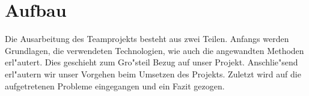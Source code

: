 \section{Aufbau}
\label {sec:aufbau}
Die Ausarbeitung des Teamprojekts besteht aus zwei Teilen.\newline
Anfangs werden Grundlagen, die verwendeten Technologien, wie auch die angewandten Methoden erl"autert. Dies geschieht zum Gro"steil Bezug auf unser Projekt.\newline
Anschlie"send erl"autern wir unser Vorgehen beim Umsetzen des Projekts. Zuletzt wird auf die aufgetretenen Probleme eingegangen und ein Fazit gezogen.
